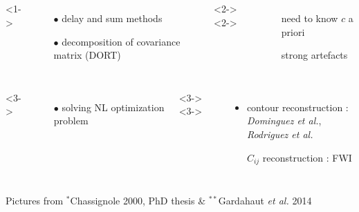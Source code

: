 \documentclass[11pt,xcolor=x11names,compress, notes=show]{beamer}%
\begin{document}
\begin{frame}{\insertsectionhead}
\begin{columns}[c]
	\end{columns}
	\vspace{0.3cm}
	\begin{columns}[c]
			<1->
				\begin{itemize}
					\item[$\bullet$] delay and sum methods
					\item[$\bullet$] decomposition of covariance matrix (DORT)
				\end{itemize}
			<2->
			<2->
				\begin{itemize}
					\item[\ding{55}] need to know $c$ a priori\\
					\item[\ding{55}] strong artefacts
				\end{itemize}
			
	\end{columns}
	\begin{columns}[c]
		<3->
			\begin{itemize}
				\item[$\bullet$] solving NL optimization problem
			\end{itemize}
		<3->
		<3->
			\begin{itemize}
			\item contour reconstruction :\\\hspace{-0.5cm}\small{\emph{Dominguez et al.}, \emph{Rodriguez et al.}}\\[0.1cm]
			\item[\ding{51}] \normalsize{$C_{ij}$ reconstruction : FWI}
		\end{itemize}		
	\end{columns}
\vfill
{\tiny Pictures from $^{*}$Chassignole 2000, PhD thesis \& $^{**}$Gardahaut \emph{et al.} 2014}\vspace{-0.5cm}
\end{frame} 
\end{document}

